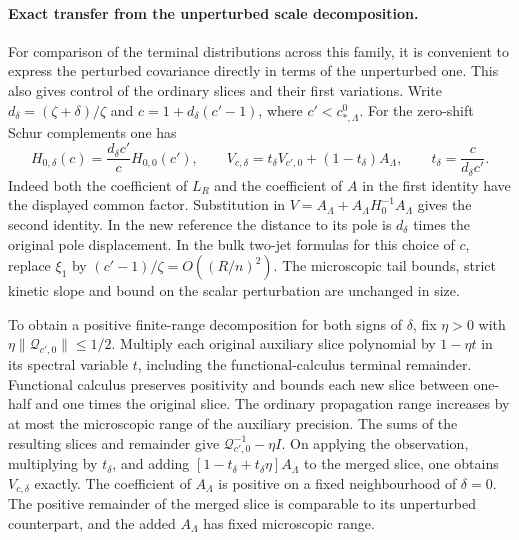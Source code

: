 \documentclass[11pt]{article}
\theoremstyle{definition}
\begin{document}
\paragraph{Exact transfer from the unperturbed scale decomposition.}
For comparison of the terminal distributions across this family,
it is convenient to express the perturbed covariance directly in
terms of the unperturbed one. This also gives control of the
ordinary slices and their first variations. Write
\(d_\delta=(\zeta+\delta)/\zeta\) and
\(c=1+d_\delta(c'-1)\), where \(c'<c_{*,\Lambda}^0\).
For the zero-shift Schur complements one has
\begin{equation}
 H_{0,\delta}(c)=\frac{d_\delta c'}{c}H_{0,0}(c'),\qquad
 V_{c,\delta}=t_\delta V_{c',0}+(1-t_\delta)A_\Lambda,
 \qquad t_\delta=\frac{c}{d_\delta c'}.
\end{equation}
Indeed both the coefficient of \(L_R\) and the coefficient
of \(A\) in the first identity have the displayed common
factor. Substitution in
\(V=A_\Lambda+A_\Lambda H_0^{-1}A_\Lambda\) gives the second
identity. In the new reference the distance to its pole is
\(d_\delta\) times the original pole displacement. In the bulk
two-jet formulas for this choice of \(c\), replace \(\xi_1\) by
\((c'-1)/\zeta=O((R/n)^2)\). The microscopic tail bounds,
strict kinetic slope and bound on the scalar perturbation
are unchanged in size.

To obtain a positive finite-range decomposition for both signs
of \(\delta\), fix \(\eta>0\) with
\(\eta\|\mathcal Q_{c',0}\|\le 1/2\). Multiply each original
auxiliary slice polynomial by \(1-\eta t\) in its spectral
variable \(t\), including the functional-calculus terminal
remainder. Functional calculus preserves positivity and bounds
each new slice between one-half and one times the original
slice. The ordinary propagation range increases by at most
the microscopic range of the auxiliary precision. The sums
of the resulting slices and remainder give
\(\mathcal Q_{c',0}^{-1}-\eta I\).
On applying the observation, multiplying by \(t_\delta\), and
adding \([1-t_\delta+t_\delta\eta]A_\Lambda\) to the merged
slice, one obtains \(V_{c,\delta}\) exactly. The coefficient
of \(A_\Lambda\) is positive on a fixed neighbourhood of
\(\delta=0\). The positive remainder of the merged slice is
comparable to its unperturbed counterpart, and the added
\(A_\Lambda\) has fixed microscopic range.
\end{document}
